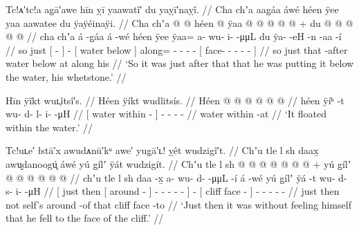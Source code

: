 
\ex\label{ex:91-41-put-below-water-whetstone}%
%
\begingl
	\glpreamble	Tc!ᴀ′tc!a ag̣ā′awe hīn ỵī yaawatî′ du yaỵī′naỵî. //
	\glpreamble	Cha chʼa aag̱áa áwé héen ÿee yaa aawatee du ÿaÿéinaÿi. //
	\gla	Cha chʼa {}  @ {} {}  @ {}
		{} héen  @ {} {}
		ÿaa @  @ {} @ {} @ {} @ {} +
		{} du  @ {} @ {} @ {} @ {} @ {} {} //
	\glb	cha chʼa {} á -g̱áa {} á -wé
		{} héen ÿee {} {}
		ÿaa= a- wu- i-  -μμL
		{} du ÿa-  -eH -n -aa -í {} //
	\glc	so just {}[  - {}]  -
		{}[ water below \· {}]
		along= - - -  -
		{}[  face-  - - - - {}] //
	\gld	so just {} that -after {}  {}
		{} water below \·at {}
		along  {} {} {} {}
		{} his  {} {} {} {} {} {} //
	\glft	‘So it was just after that that he was putting it below the water, his whetstone.’
		//
\endgl
\xe


\ex\label{ex:91-42-it-floated}%
%
\begingl
	\glpreamble	Hīn ÿîkt wuʟ̣îtsî′s. //
	\glpreamble	Héen ÿíkt wudlitsís. //
	\gla	{} Héen  @ {} {}
		 @ {} @ {} @ {} @ {} @ {} //
	\glb	{} héen ÿíᵏ -t {}
		wu- d- l- i-  -μH //
	\glc	{}[ water within - {}]
		- - -  - //
	\gld	{} water within -at {}
		 {} {} {} {} {} //
	\glft	‘It floated within the water.’
		//
\endgl
\xe



\ex\label{ex:91-43-unfeeling-face-of-cliff}%
%
\begingl
	\glpreamble	Tc!uʟe′ łstā′x awudᴀnū′kᵘ awe′ yug̣ā′ʟ! ỵêt wudzigî′t. //
	\glpreamble	Chʼu tle l sh daax̱ awu̬danoogú̥ áwé yú g̱ílʼ ÿát wudzigít. //
	\gla	{} Chʼu tle l {} sh  @ {} {}
			 @ {} @ {} @ {} @ {} @ {} {}
		 @ {} +
		{} yú g̱ílʼ  @ {} {}
		 @ {} @ {} @ {} @ {} @ {} //
	\glb	{} chʼu tle l {} sh daa -x̱ {}
			a- wu- d-  -μμL -í {}
		á -wé
		{} yú g̱ílʼ ÿá -t {}
		wu- d- s- i-  -μH //
	\glc	{}[ just then  {}[  around - {}]
			- - -  - - {}]
		 -
		{}[  cliff face - {}]
		- - - -  - //
	\gld	{} just then not {} self’s around -of {}
			 {} {} {} {} {} {}
		 {}
		{} that cliff face -to {}
		 {} {} {} {} {} //
	\glft	‘Just then it was without feeling himself that he fell to the face of the cliff.’
		//
\endgl
\xe

